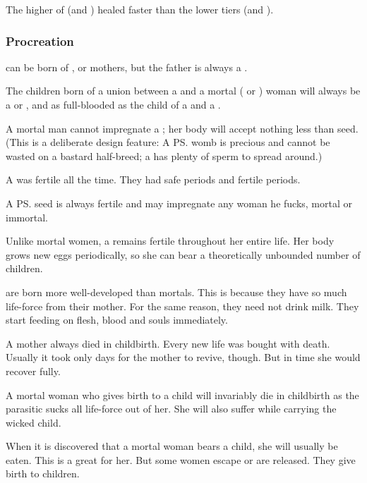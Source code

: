 The higher  of \resphain (\satharioth and \ketherain) healed faster than the lower tiers (\thelyadeth and \bezedeth). 






\subsubsection{Procreation}
\Resphain{} can be born of \resvil{}, \human{} or \nephilic{} mothers, but the father is always a \resphan. 

The children born of a union between a \resphan{} and a mortal (\human{} or \nephil) woman will always be a \resphan{} or \resvil, and as full-blooded as the child of a \resphan{} and a \resvil. 

A mortal man cannot impregnate a \resvil; her body will accept nothing less than \resphan{} seed. 
(This is a deliberate design feature: A \ps{\resvil}{} womb is precious and cannot be wasted on a bastard half-breed; a \resphan{} has plenty of sperm to spread around.)

A \resvil was fertile all the time.
They had safe periods and fertile periods. 

A \ps{\resphan} seed is always fertile and may impregnate any woman he fucks, mortal or immortal. 

Unlike mortal women, a \resvil{} remains fertile throughout her entire life. 
Her body grows new eggs periodically, so she can bear a theoretically unbounded number of children. 

\Resphain{} are born more well-developed than mortals. 
This is because they have  so much life-force from their mother. 
For the same reason, they need not drink milk. 
They start feeding on flesh, blood and souls immediately. 

A \resvil mother always died in childbirth.
Every new \resphan life was bought with death.
Usually it took only days for the mother to revive, though.
But in time she would recover fully. 

A mortal woman who gives birth to a \resphan{} child will invariably die in childbirth as the parasitic \resphan{} sucks all life-force out of her. 
She will also suffer while carrying the wicked child. 

When it is discovered that a mortal woman bears a \resphan{} child, she will usually be eaten. 
This is a great \honour for her. 
But some women escape or are released. 
They give birth to  children. 

